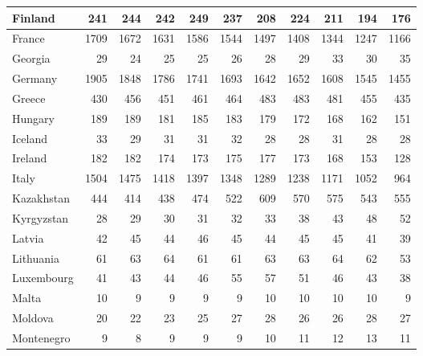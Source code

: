 \begin{table}
\begin{tabular}{|l|r|r|r|r|r|r|r|r|r|r|}
                       Finland&    241&    244&    242&    249&    237&    208&    224&    211&    194&    176\\\hline
                        France&   1709&   1672&   1631&   1586&   1544&   1497&   1408&   1344&   1247&   1166\\\hline
                       Georgia&     29&     24&     25&     25&     26&     28&     29&     33&     30&     35\\\hline
                       Germany&   1905&   1848&   1786&   1741&   1693&   1642&   1652&   1608&   1545&   1455\\\hline
                        Greece&    430&    456&    451&    461&    464&    483&    483&    481&    455&    435\\\hline
                       Hungary&    189&    189&    181&    185&    183&    179&    172&    168&    162&    151\\\hline
                       Iceland&     33&     29&     31&     31&     32&     28&     28&     31&     28&     28\\\hline
                       Ireland&    182&    182&    174&    173&    175&    177&    173&    168&    153&    128\\\hline
                         Italy&   1504&   1475&   1418&   1397&   1348&   1289&   1238&   1171&   1052&    964\\\hline
                    Kazakhstan&    444&    414&    438&    474&    522&    609&    570&    575&    543&    555\\\hline
                    Kyrgyzstan&     28&     29&     30&     31&     32&     33&     38&     43&     48&     52\\\hline
                        Latvia&     42&     45&     44&     46&     45&     44&     45&     45&     41&     39\\\hline
                     Lithuania&     61&     63&     64&     61&     61&     63&     63&     64&     62&     53\\\hline
                    Luxembourg&     41&     43&     44&     46&     55&     57&     51&     46&     43&     38\\\hline
                         Malta&     10&      9&      9&      9&      9&     10&     10&     10&     10&      9\\\hline
                       Moldova&     20&     22&     23&     25&     27&     28&     26&     26&     28&     27\\\hline
                    Montenegro&      9&      8&      9&      9&      9&     10&     11&     12&     13&     11\\\hline

\end{tabular}
\end{table}
